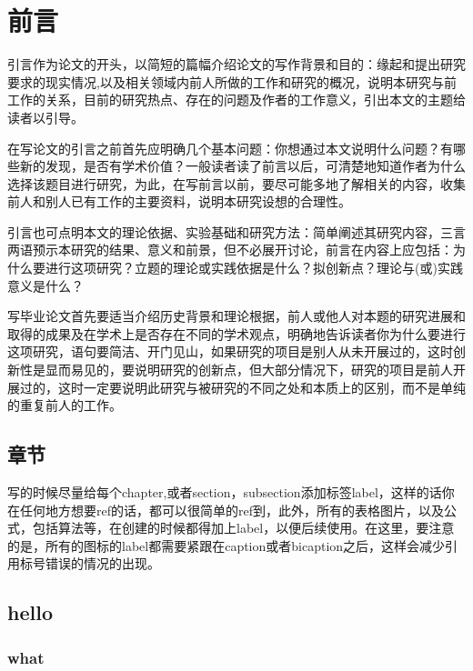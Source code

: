 \chapter{前言}\label{chap1:pre}

引言作为论文的开头，以简短的篇幅介绍论文的写作背景和目的：缘起和提出研究要求的现实情况,以及相关领域内前人所做的工作和研究的概况，说明本研究与前工作的关系，目前的研究热点、存在的问题及作者的工作意义，引出本文的主题给读者以引导。

在写论文的引言之前首先应明确几个基本问题：你想通过本文说明什么问题？有哪些新的发现，是否有学术价值？一般读者读了前言以后，可清楚地知道作者为什么选择该题目进行研究，为此，在写前言以前，要尽可能多地了解相关的内容，收集前人和别人已有工作的主要资料，说明本研究设想的合理性。

引言也可点明本文的理论依据、实验基础和研究方法：简单阐述其研究内容，三言两语预示本研究的结果、意义和前景，但不必展开讨论，前言在内容上应包括：为什么要进行这项研究？立题的理论或实践依据是什么？拟创新点？理论与(或)实践意义是什么？

写毕业论文首先要适当介绍历史背景和理论根据，前人或他人对本题的研究进展和取得的成果及在学术上是否存在不同的学术观点，明确地告诉读者你为什么要进行这项研究，语句要简洁、开门见山，如果研究的项目是别人从未开展过的，这时创新性是显而易见的，要说明研究的创新点，但大部分情况下，研究的项目是前人开展过的，这时一定要说明此研究与被研究的不同之处和本质上的区别，而不是单纯的重复前人的工作。

\section{章节}

写的时候尽量给每个chapter,或者section，subsection添加标签label，这样的话你在任何地方想要ref的话，都可以很简单的ref到，此外，所有的表格图片，以及公式，包括算法等，在创建的时候都得加上label，以便后续使用。在这里，要注意的是，所有的图标的label都需要紧跟在caption或者bicaption之后，这样会减少引用标号错误的情况的出现。
\section{hello}\label{sec:is}
\lipsum[100-110]


\subsection{what}
\lipsum[110-112]
